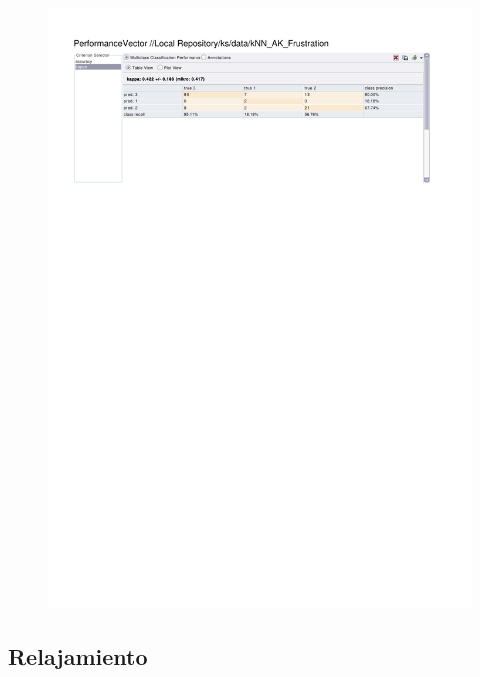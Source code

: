 \begin{figure}[htp]
  \centerline{\includegraphics[trim=0 685 0 60,clip,width=16.09cm]{results/kNN_K_Frustration.pdf}} \caption{
} \label{kNN_K_Frustration}
\end{figure}

\clearpage
\FloatBarrier
\subsection{Relajamiento}


